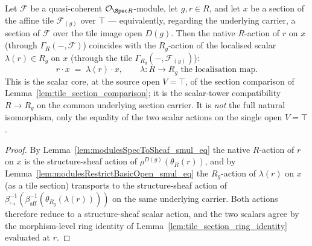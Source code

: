 \begin{lemma}
  \label{lem:tile_scalar_compat}
  Let \(\mathcal{F}\) be a quasi-coherent \(\mathcal{O}_{\Spec R}\)-module, let \(g, r \in R\), and let
  \(x\) be a section of the affine tile \(\mathcal{F}_{(g)}\) over \(\top\) --- equivalently, regarding
  the underlying carrier, a section of \(\mathcal{F}\) over the tile image open \(D(g)\). Then the native
  \(R\)-action of \(r\) on \(x\) (through \(\Gamma_R(-,\mathcal{F})\)) coincides with the \(R_g\)-action
  of the localised scalar \(\lambda(r) \in R_g\) on \(x\) (through the tile
  \(\Gamma_{R_g}(-, \mathcal{F}_{(g)})\)):
  \[
    r \cdot x \;=\; \lambda(r) \cdot x,
    \qquad \lambda : R \to R_g \text{ the localisation map}.
  \]
  This is the scalar core, at the source open \(V = \top\), of the section comparison of
  Lemma~\ref{lem:tile_section_comparison}; it is the scalar-tower compatibility \(R \to R_g\) on the
  common underlying section carrier. It is \emph{not} the full natural isomorphism, only the equality of
  the two scalar actions on the single open \(V = \top\).
\end{lemma}
\begin{proof}
    \leanok
  By Lemma~\ref{lem:modulesSpecToSheaf_smul_eq} the native \(R\)-action of \(r\) on \(x\) is the
  structure-sheaf action of \(\rho^{D(g)}(\theta_R(r))\), and by
  Lemma~\ref{lem:modulesRestrictBasicOpen_smul_eq} the \(R_g\)-action of \(\lambda(r)\) on \(x\) (as a
  tile section) transports to the structure-sheaf action of
  \(\beta_{\hookrightarrow}^{-1}(\beta_{\mathrm{aff}}^{-1}(\theta_{R_g}(\lambda(r))))\) on the same
  underlying carrier. Both actions therefore reduce to a structure-sheaf scalar action, and the two
  scalars agree by the morphism-level ring identity of Lemma~\ref{lem:tile_section_ring_identity}
  evaluated at \(r\).
\end{proof}

